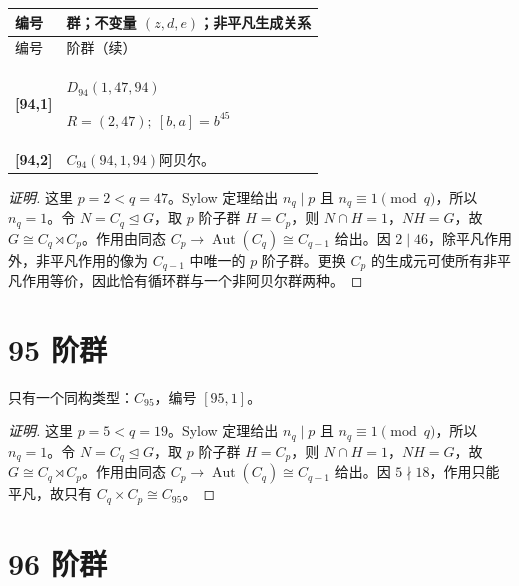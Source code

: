 \documentclass[UTF8,fontset=fandol,11pt,a4paper]{ctexart}
\newcommand{\Aut}{\operatorname{Aut}}\newcommand{\GL}{\operatorname{GL}}\newcommand{\ord}{\operatorname{ord}}\newcommand{\Z}{\mathrm Z}
\begin{document}
\begin{longtable}{@{}p{17mm}>{\raggedright\arraybackslash}p{141mm}@{}}

\toprule 编号 & 群；不变量 $(z,d,e)$；非平凡生成关系\\\midrule\endfirsthead

\toprule 编号 & 94 阶群（续）\\\midrule\endhead\bottomrule\endfoot

\textbf{[94,1]} & $D_{94}$\quad $(1,47,94)$\par\(R=(2,47);\allowbreak\ [b,a]=b^{45}\)\\[3pt]

\textbf{[94,2]} & $C_{94}$\quad $(94,1,94)$\quad 阿贝尔。\\[3pt]

\end{longtable}\endgroup

\begin{proof}[证明]
这里 $p=2<q=47$。Sylow 定理给出 $n_q\mid p$ 且 $n_q\equiv1\pmod q$，所以 $n_q=1$。令 $N=C_q\trianglelefteq G$，取 $p$ 阶子群 $H=C_p$，则 $N\cap H=1$，$NH=G$，故 $G\cong C_q\rtimes C_p$。作用由同态 $C_p\to\Aut(C_q)\cong C_{q-1}$ 给出。因 $2\mid 46$，除平凡作用外，非平凡作用的像为 $C_{q-1}$ 中唯一的 $p$ 阶子群。更换 $C_p$ 的生成元可使所有非平凡作用等价，因此恰有循环群与一个非阿贝尔群两种。
\end{proof}

\section*{95 阶群}\label{order:95}

只有一个同构类型：$C_{95}$，编号 $[95,1]$。

\begin{proof}[证明]
这里 $p=5<q=19$。Sylow 定理给出 $n_q\mid p$ 且 $n_q\equiv1\pmod q$，所以 $n_q=1$。令 $N=C_q\trianglelefteq G$，取 $p$ 阶子群 $H=C_p$，则 $N\cap H=1$，$NH=G$，故 $G\cong C_q\rtimes C_p$。作用由同态 $C_p\to\Aut(C_q)\cong C_{q-1}$ 给出。因 $5\nmid 18$，作用只能平凡，故只有 $C_q\times C_p\cong C_{95}$。
\end{proof}

\section*{96 阶群}\label{order:96}
\end{document}
